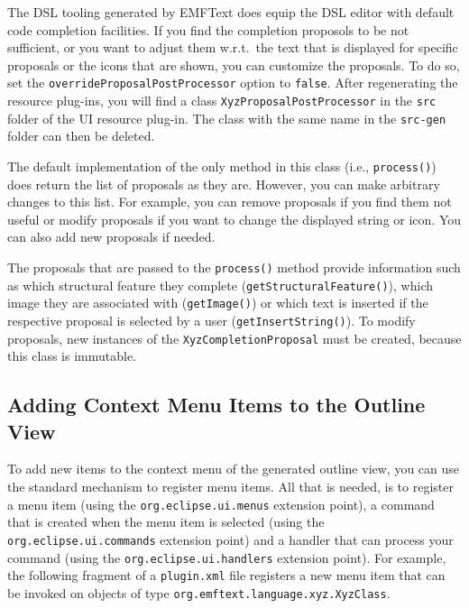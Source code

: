 The DSL tooling generated by EMFText does equip the DSL editor with default code
completion facilities. If you find the completion proposols to be not
sufficient, or you want to adjust them w.r.t.~the text that is displayed for
specific proposals or the icons that are shown, you can customize the proposals.
To do so, set the \texttt{overrideProposalPostProcessor} option to \texttt{false}. 
After regenerating the resource plug-ins, you will find a class
\texttt{XyzProposalPostProcessor} in the \texttt{src} folder of the UI resource
plug-in. The class with the same name in the \texttt{src-gen} folder can then be
deleted.

The default implementation of the only method in this class (i.e.,
\texttt{process()}) does return the list of proposals as they are. However, you
can make arbitrary changes to this list. For example, you can remove proposals
if you find them not useful or modify proposals if you want to change the
displayed string or icon. You can also add new proposals if needed.

The proposals that are passed to the \texttt{process()} method provide 
information such as which structural feature they complete
(\texttt{getStructuralFeature()}), which image they are associated with
(\texttt{getImage()}) or which text is inserted if the respective proposal is
selected by a user (\texttt{getInsertString()}). To modify proposals, new
instances of the \texttt{XyzCompletionProposal} must be created, because this 
class is immutable.

\subsection{Adding Context Menu Items to the Outline View}

To add new items to the context menu of the generated outline view, you can use
the standard mechanism to register menu items. All that is needed, is to
register a menu item (using the \texttt{org.eclipse.ui.menus} extension point),
a command that is created when the menu item is selected (using the
\texttt{org.eclipse.ui.commands} extension point) and a handler that can process
your command (using the \texttt{org.eclipse.ui.handlers} extension point). For
example, the following fragment of a \texttt{plugin.xml} file registers a new
menu item that can be invoked on objects of type
\texttt{org.emftext.language.xyz.XyzClass}.

